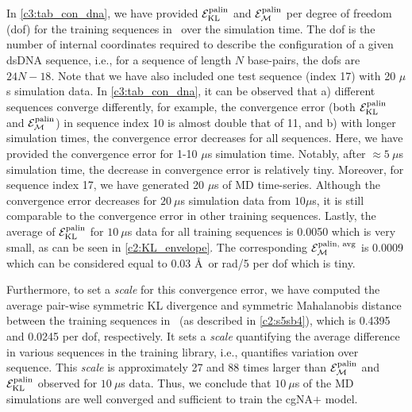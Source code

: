 In \cref{c3:tab_con_dna}, we have provided ${\mathcal E}_{\text{KL}}^{\text{palin}}$ and  ${\mathcal E}_{\mathcal{M}}^{\text{palin}}$ per degree of freedom (dof) for the training sequences in \Lbdna \ over the simulation time.
The dof is the number of internal coordinates required to describe the configuration of a given dsDNA sequence, i.e., for a sequence of length $N$ base-pairs, the dofs are $24N-18$.
Note that we have also included one test sequence (index 17) with 20 $\mu$s simulation data.  
In \cref{c3:tab_con_dna}, it can be observed that a) different sequences converge differently, for example, the convergence error (both ${\mathcal E}_{\text{KL}}^{\text{palin}}$ and ${\mathcal E}_{\mathcal{M}}^{\text{palin}}$) in sequence index 10 is almost double that of 11, and b) with longer simulation times, the convergence error decreases for all sequences. 
Here, we have provided the convergence error for 1-10 $\mu$s simulation time. 
Notably, after $\approx 5 \ \mu$s simulation time, the decrease in convergence error is relatively tiny.
Moreover, for sequence index 17, we have generated 20 $\mu$s of MD time-series. Although the convergence error decreases for $20 \ \mu$s simulation data from $10 \mu$s, it is still comparable to the convergence error in other training sequences. 
Lastly, the average of ${\mathcal E}_{\text{KL}}^{\text{palin}}$ for $10 \ \mu$s data for all training sequences is 0.0050 which is very small, as can be seen in \cref{c2:KL_envelope}.
The corresponding ${\mathcal E}_{\mathcal{M}}^{\text{palin, avg}}$ is 0.0009 which can be considered equal to 0.03 \AA \ or rad/5 per dof which is tiny.

Furthermore, to set a \textit{scale} for this convergence error, we have computed the average pair-wise symmetric KL divergence and symmetric Mahalanobis distance between the training sequences in \Lbdna \ (as described in \cref{c2:s5sb4}), which is 0.4395 and 0.0245 per dof, respectively.
It sets a \textit{scale} quantifying the average difference in various sequences in the training library, i.e., quantifies variation over sequence.
This \textit{scale} is approximately 27 and 88 times larger than ${\mathcal E}_{\mathcal{M}}^{\text{palin}}$  and  ${\mathcal E}_{\text{KL}}^{\text{palin}}$ observed for $10 \ \mu$s data. 
Thus, we conclude that $10 \ \mu$s of the MD simulations are well converged and sufficient to train the cgNA$+$ model.

